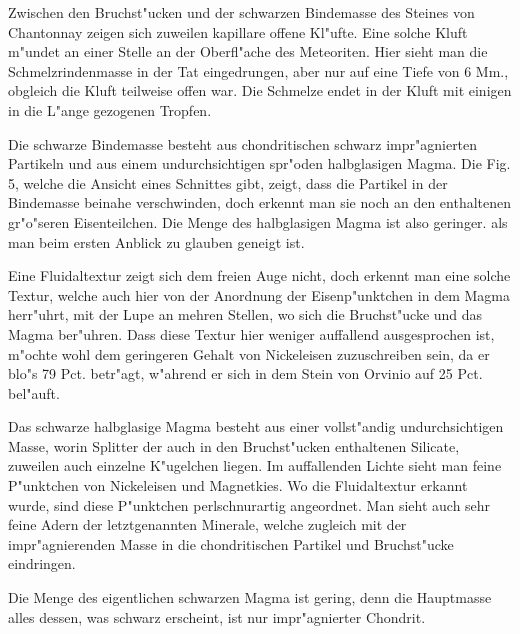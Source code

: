 \documentclass[a4paper, 11pt, oneside]{article}
\begin{document}
Zwischen den Bruchst"ucken und der schwarzen Bindemasse des Steines von Chantonnay zeigen sich zuweilen kapillare offene Kl"ufte. Eine solche Kluft m"undet an einer Stelle an der Oberfl"ache des Meteoriten. Hier sieht man die Schmelzrindenmasse in der Tat eingedrungen, aber nur auf eine Tiefe von 6 Mm., obgleich die Kluft teilweise offen war. Die Schmelze endet in der Kluft mit einigen in die L"ange gezogenen Tropfen.

Die schwarze Bindemasse besteht aus chondritischen schwarz impr"agnierten Partikeln und aus einem undurchsichtigen spr"oden halbglasigen Magma. Die Fig. 5, welche die Ansicht eines Schnittes gibt, zeigt, dass die Partikel in der Bindemasse beinahe verschwinden, doch erkennt man sie noch an den enthaltenen gr"o"seren Eisenteilchen. Die Menge des halbglasigen Magma ist also geringer. als man beim ersten Anblick zu glauben geneigt ist.

Eine Fluidaltextur zeigt sich dem freien Auge nicht, doch erkennt man eine solche Textur, welche auch hier von der Anordnung der Eisenp"unktchen in dem Magma herr"uhrt, mit der Lupe an mehren Stellen, wo sich die Bruchst"ucke und das Magma ber"uhren. Dass diese Textur hier weniger auffallend ausgesprochen ist, m"ochte wohl dem geringeren Gehalt von Nickeleisen zuzuschreiben sein, da er blo"s 79 Pct. betr"agt, w"ahrend er sich in dem Stein von Orvinio auf 25 Pct. bel"auft.

Das schwarze halbglasige Magma besteht aus einer vollst"andig undurchsichtigen Masse, worin Splitter der auch in den Bruchst"ucken enthaltenen Silicate, zuweilen auch einzelne K"ugelchen liegen. Im auffallenden Lichte sieht man feine P"unktchen von Nickeleisen und Magnetkies. Wo die Fluidaltextur erkannt wurde, sind diese P"unktchen perlschnurartig angeordnet. Man sieht auch sehr feine Adern der letztgenannten Minerale, welche zugleich mit der impr"agnierenden Masse in die chondritischen Partikel und Bruchst"ucke eindringen.

Die Menge des eigentlichen schwarzen Magma ist gering, denn die Hauptmasse alles dessen, was schwarz erscheint, ist nur impr"agnierter Chondrit.
\end{document}

